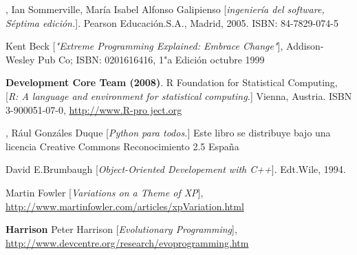 \documentclass[12pt]{book} %
\begin{document}
\begin{thebibliography}{99} %

\small
{},
Ian Sommerville, María Isabel Alfonso Galipienso
[\textit{ingeniería del software, Séptima edición.}]. 
Pearson Educación.S.A., Madrid, 2005. ISBN: 84-7829-074-5

Kent Beck 
[\textit{"Extreme Programming Explained: Embrace Change"}],
Addison-Wesley Pub Co; ISBN: 0201616416, 1"a Edición octubre 1999

 {\textbf{Development Core Team (2008)}}. 
R Foundation for Statistical Computing, 
[\textit{R: A language and environment for statistical computing.}]
Vienna, Austria. ISBN 3-900051-07-0, \href{http://www.R-pro ject.org}{http://www.R-pro ject.org}


,
Rául Gonzáles Duque
[\textit{Python para todos.}]
Este libro se distribuye bajo una licencia Creative Commons Reconocimiento 2.5 España

David E.Brumbaugh
[\textit{Object-Oriented Developement with C++}]. 
Edt.Wile, 1994.


Martin Fowler 
[\textit{Variations on a Theme of XP}], 
\href{http://www.martinfowler.com/articles/xpVariation.html}{http://www.martinfowler.com/articles/xpVariation.html}

 {\textbf{Harrison}}
Peter Harrison 
[\textit {Evolutionary Programming}],
\href{http://www.devcentre.org/research/evoprogramming.htm}{http://www.devcentre.org/research/evoprogramming.htm}


\end{thebibliography}


 
\end{document}
